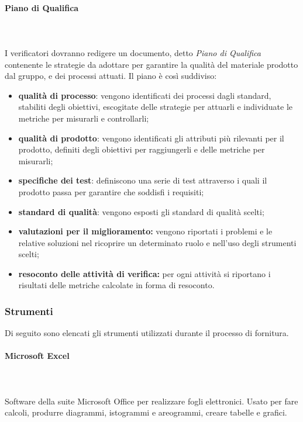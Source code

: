 \paragraph{Piano di Qualifica} \mbox{}\\ \mbox{}\\
I verificatori dovranno redigere un documento, detto \textit{Piano di 
Qualifica} contenente le strategie da adottare per garantire la qualità del 
materiale prodotto dal gruppo, e dei processi attuati. Il piano è così 
suddiviso:
	\begin{itemize}
		\item \textbf{qualità di processo}: vengono identificati dei processi dagli 
			standard, stabiliti degli obiettivi, escogitate delle strategie per attuarli e 			
			individuate le metriche per misurarli e controllarli;
		\item \textbf{qualità di prodotto}: vengono identificati gli attributi più 
			rilevanti per il prodotto, definiti degli obiettivi per raggiungerli e delle 
			metriche per misurarli;
		\item \textbf{specifiche dei test}: definiscono una serie di test attraverso 
			i quali il prodotto passa per garantire che soddisfi i requisiti;
		\item \textbf{standard di qualità}: vengono esposti gli standard di qualità 
			scelti;
		\item \textbf{valutazioni per il miglioramento:} vengono riportati i problemi 
			e le relative soluzioni nel ricoprire un determinato ruolo e nell'uso degli 
			strumenti scelti;
		\item \textbf{resoconto delle attività di verifica:} per ogni attività si 
			riportano i risultati delle metriche calcolate in forma di resoconto.
	\end{itemize}
		
\subsubsection{Strumenti}
Di seguito sono elencati gli strumenti utilizzati durante il processo di 
fornitura.

\paragraph{Microsoft Excel} \mbox{}\\ \mbox{}\\
Software della suite Microsoft Office per realizzare fogli elettronici. Usato 
per fare calcoli, produrre diagrammi, istogrammi e areogrammi, creare tabelle e 
grafici.
		
